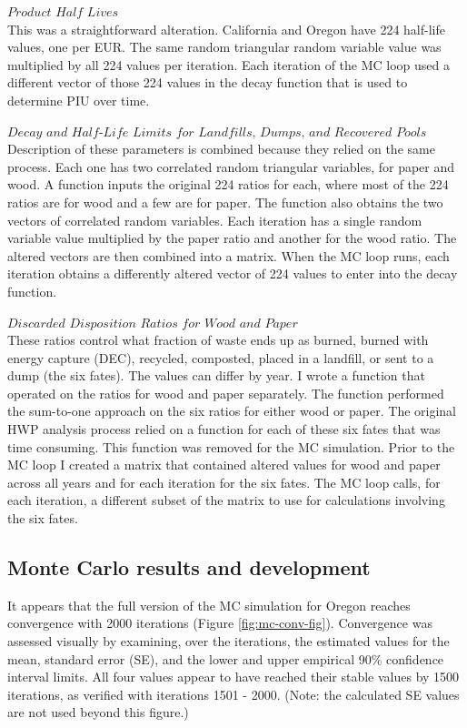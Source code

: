 \documentclass[
  openany]{book}
\begin{document}
\(\textit{Product Half Lives}\)\\
This was a straightforward alteration. California and Oregon have 224 half-life values, one per EUR. The same random triangular random variable value was multiplied by all 224 values per iteration. Each iteration of the MC loop used a different vector of those 224 values in the decay function that is used to determine PIU over time.

\(\textit{Decay and Half-Life Limits for Landfills, Dumps, and Recovered Pools}\)\\
Description of these parameters is combined because they relied on the same process. Each one has two correlated random triangular variables, for paper and wood. A function inputs the original 224 ratios for each, where most of the 224 ratios are for wood and a few are for paper. The function also obtains the two vectors of correlated random variables. Each iteration has a single random variable value multiplied by the paper ratio and another for the wood ratio. The altered vectors are then combined into a matrix. When the MC loop runs, each iteration obtains a differently altered vector of 224 values to enter into the decay function.

\(\textit{Discarded Disposition Ratios for Wood and Paper}\)\\
These ratios control what fraction of waste ends up as burned, burned with energy capture (DEC), recycled, composted, placed in a landfill, or sent to a dump (the six fates). The values can differ by year. I wrote a function that operated on the ratios for wood and paper separately. The function performed the sum-to-one approach on the six ratios for either wood or paper. The original HWP analysis process relied on a function for each of these six fates that was time consuming. This function was removed for the MC simulation. Prior to the MC loop I created a matrix that contained altered values for wood and paper across all years and for each iteration for the six fates. The MC loop calls, for each iteration, a different subset of the matrix to use for calculations involving the six fates.

\hypertarget{model-mc-res}{%
\subsection{Monte Carlo results and development}\label{model-mc-res}}

It appears that the full version of the MC simulation for Oregon reaches convergence with 2000 iterations (Figure \ref{fig:mc-conv-fig}). Convergence was assessed visually by examining, over the iterations, the estimated values for the mean, standard error (SE), and the lower and upper empirical 90\% confidence interval limits. All four values appear to have reached their stable values by 1500 iterations, as verified with iterations 1501 - 2000. (Note: the calculated SE values are not used beyond this figure.)
\end{document}
